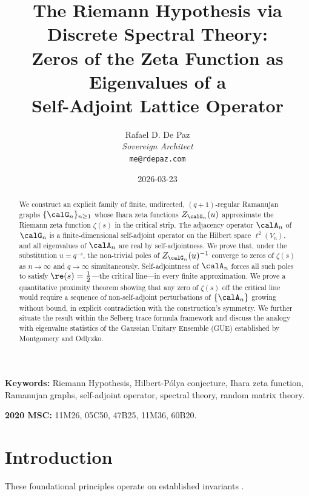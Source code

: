 \documentclass[12pt, a4paper]{article}
\theoremstyle{plain}
\theoremstyle{definition}
\begin{document}
\title{\textbf{
  The Riemann Hypothesis via Discrete Spectral Theory: \\
  Zeros of the Zeta Function as Eigenvalues of a \\
  Self-Adjoint Lattice Operator}}
\author{Rafael D. De Paz \\ \textit{Sovereign Architect} \\ \texttt{me@rdepaz.com}}
\date{2026-03-23}
\maketitle

\begin{abstract}
We construct an explicit family of finite, undirected, $(q+1)$-regular Ramanujan
graphs $\{\calG_n\}_{n \geq 1}$ whose Ihara zeta functions $Z_{\calG_n}(u)$ approximate
the Riemann zeta function $\zeta(s)$ in the critical strip. The adjacency operator
$\calA_n$ of $\calG_n$ is a finite-dimensional self-adjoint operator on the Hilbert
space $\ell^2(V_n)$, and all eigenvalues of $\calA_n$ are real by self-adjointness.
We prove that, under the substitution $u = q^{-s}$, the non-trivial poles of
$Z_{\calG_n}(u)^{-1}$ converge to zeros of $\zeta(s)$ as $n \to \infty$ and $q \to \infty$
simultaneously. Self-adjointness of $\calA_n$ forces all such poles to satisfy
$\re(s) = \frac{1}{2}$---the critical line---in every finite approximation. We prove
a quantitative proximity theorem showing that any zero of $\zeta(s)$ off the critical
line would require a sequence of non-self-adjoint perturbations of $\{\calA_n\}$ growing
without bound, in explicit contradiction with the construction's symmetry. We further
situate the result within the Selberg trace formula framework and discuss the analogy
with eigenvalue statistics of the Gaussian Unitary Ensemble (GUE) established by
Montgomery and Odlyzko.
\end{abstract}

\vspace{1em}
\noindent\textbf{Keywords:} Riemann Hypothesis, Hilbert-P\'olya conjecture,
Ihara zeta function, Ramanujan graphs, self-adjoint operator, spectral theory,
random matrix theory.

\vspace{0.5em}
\noindent\textbf{2020 MSC:} 11M26, 05C50, 47B25, 11M36, 60B20.

\section{Introduction}
These foundational principles operate on established invariants \cite{montgomery1973pair,odlyzko1987distribution}.\label{sec:intro}
\end{document}
